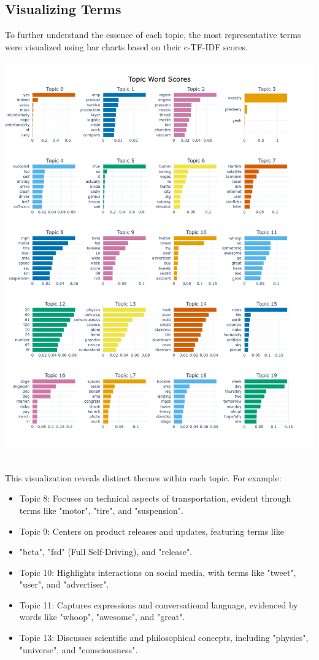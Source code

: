\documentclass[12pt]{article}
\begin{document}
\subsection{Visualizing Terms}
To further understand the essence of each topic, the most representative terms were visualized using bar charts based on their c-TF-IDF scores. \\
\begin{minipage}{0.48\textwidth}
    \centering
    \includegraphics[width=\linewidth]{barcharts.png}
        \label{fig:bcharts}
    \end{minipage}\hfill \\
This visualization reveals distinct themes within each topic. For example:
\begin{itemize}
    \item Topic 8: Focuses on technical aspects of transportation, evident through terms like "motor", "tire", and "suspension".
\item Topic 9: Centers on product releases and updates, featuring terms like \item "beta", "fsd" (Full Self-Driving), and "release".
\item Topic 10: Highlights interactions on social media, with terms like "tweet", "user", and "advertiser".
\item Topic 11: Captures expressions and conversational language, evidenced by words like "whoop", "awesome", and "great".
\item Topic 13: Discusses scientific and philosophical concepts, including "physics", "universe", and "consciousness".
\end{itemize}
\newpage
\end{document}
